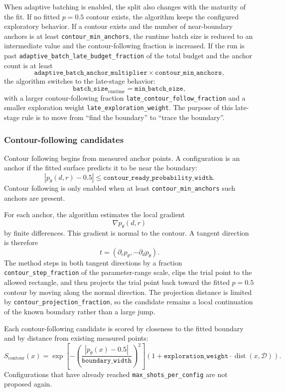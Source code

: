 When adaptive batching is enabled, the split also changes with the maturity of
the fit.  If no fitted \(p=0.5\) contour exists, the algorithm keeps the
configured exploratory behavior.  If a contour exists and the number of
near-boundary anchors is at least \texttt{contour\_min\_anchors}, the runtime
batch size is reduced to an intermediate value and the contour-following
fraction is increased.  If the run is past
\texttt{adaptive\_batch\_late\_budget\_fraction} of the total budget and the
anchor count is at least
\[
    \texttt{adaptive\_batch\_anchor\_multiplier}
    \times
    \texttt{contour\_min\_anchors},
\]
the algorithm switches to the late-stage behavior:
\[
    \texttt{batch\_size}_{\mathrm{runtime}}
    =
    \texttt{min\_batch\_size},
\]
with a larger contour-following fraction
\texttt{late\_contour\_follow\_fraction} and a smaller exploration weight
\texttt{late\_exploration\_weight}.  The purpose of this late-stage rule is to
move from ``find the boundary'' to ``trace the boundary''.

\subsubsection{Contour-following candidates}

Contour following begins from measured anchor points.  A configuration is an
anchor if the fitted surface predicts it to be near the boundary:
\[
    |p_\theta(d,r)-0.5|
    \leq
    \texttt{contour\_ready\_probability\_width}.
\]
Contour following is only enabled when at least
\texttt{contour\_min\_anchors} such anchors are present.

For each anchor, the algorithm estimates the local gradient
\[
    \nabla p_\theta(d,r)
\]
by finite differences.  This gradient is normal to the contour.  A tangent
direction is therefore
\[
    t = (\partial_r p_\theta, -\partial_d p_\theta).
\]
The method steps in both tangent directions by a fraction
\texttt{contour\_step\_fraction} of the parameter-range scale, clips the trial
point to the allowed rectangle, and then projects the trial point back toward
the fitted \(p=0.5\) contour by moving along the normal direction.  The
projection distance is limited by \texttt{contour\_projection\_fraction}, so the
candidate remains a local continuation of the known boundary rather than a
large jump.

Each contour-following candidate is scored by closeness to the fitted boundary
and by distance from existing measured points:
\[
    S_{\mathrm{contour}}(x)
    =
    \exp\!\left[
        -\left(
            \frac{|p_\theta(x)-0.5|}
                 {\texttt{boundary\_width}}
        \right)^2
    \right]
    \left(
        1
        +
        \texttt{exploration\_weight}
        \cdot
        \operatorname{dist}(x,\mathcal{D})
    \right).
\]
Configurations that have already reached \texttt{max\_shots\_per\_config} are
not proposed again.

